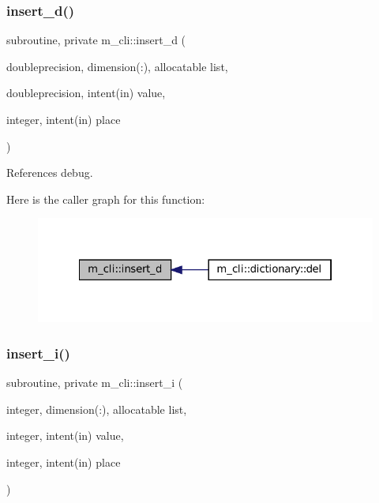 \subsubsection{\texorpdfstring{insert\+\_\+d()}{insert\_d()}}
{\footnotesize\ttfamily subroutine, private m\+\_\+cli\+::insert\+\_\+d (\begin{DoxyParamCaption}\item[{doubleprecision, dimension(\+:), allocatable}]{list,  }\item[{doubleprecision, intent(in)}]{value,  }\item[{integer, intent(in)}]{place }\end{DoxyParamCaption})\hspace{0.3cm}{\ttfamily [private]}}



References debug.

Here is the caller graph for this function\+:\nopagebreak
\begin{figure}[H]
\begin{center}
\leavevmode
\includegraphics[width=322pt]{namespacem__cli_a030e31579a7968aea68d80db1e36ebfd_icgraph}
\end{center}
\end{figure}
\mbox{\label{namespacem__cli_a841685591ef1f1827fc1fe32a7f546f1}} 
\subsubsection{\texorpdfstring{insert\+\_\+i()}{insert\_i()}}
{\footnotesize\ttfamily subroutine, private m\+\_\+cli\+::insert\+\_\+i (\begin{DoxyParamCaption}\item[{integer, dimension(\+:), allocatable}]{list,  }\item[{integer, intent(in)}]{value,  }\item[{integer, intent(in)}]{place }\end{DoxyParamCaption})\hspace{0.3cm}{\ttfamily [private]}}



